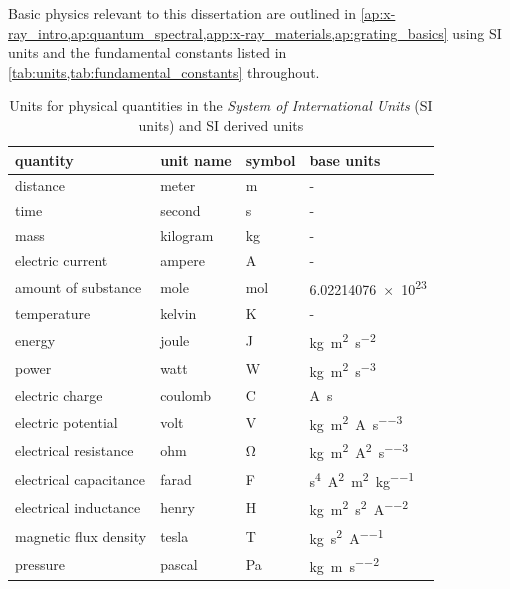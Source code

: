 \label{ap:x-ray_intro}
Basic physics relevant to this dissertation are outlined in \cref{ap:x-ray_intro,ap:quantum_spectral,app:x-ray_materials,ap:grating_basics} using SI units and the fundamental constants listed in \cref{tab:units,tab:fundamental_constants} throughout. 
\begin{table}[]
 \centering
 \caption[SI units for physical quantities]{Units for physical quantities in the \emph{System of International Units} (SI units) and SI derived units} \label{tab:units}
 \begin{tabular}{@{}llll@{}} 
 \toprule
 quantity & unit name & symbol & base units \\ \midrule 
 distance & meter & \si{\metre} & - \\
 time & second & \si{\second} & - \\
 mass & kilogram & \si{\kilogram} & - \\
 electric current & ampere & \si{\ampere} & - \\
 amount of substance & mole & \si{\mole}  & \num{6.02214076e23} \\ 
 temperature & kelvin & \si{\kelvin} & - \\ \midrule 
 energy & joule & \si{\joule} & \si{\kilogram\square\metre\per\square\second} \\
 power & watt & \si{\watt} & \si{\kilogram\square\metre\per\second\tothe{3}} \\ 
 electric charge & coulomb & \si{\coulomb} & \si{\ampere\second} \\
 electric potential & volt & \si{\volt} & \si{\kilogram\square\metre\per\ampere\per\second\tothe{3}} \\
 electrical resistance & ohm & \si{\ohm} & \si{\kilogram\square\metre\per\ampere\tothe{2}\per\second\tothe{3}} \\
 electrical capacitance & farad & \si{\farad} & \si{\second\tothe{4}\ampere\tothe{2}\per\square\metre\per\kilogram} \\
 electrical inductance & henry & \si{\henry} & \si{\kilogram\square\metre\per\square\second\per\square\ampere} \\
 magnetic flux density & tesla & \si{\tesla} & \si{\kilogram\per\square\second\per\ampere} \\
 pressure & pascal & \si{\pascal} & \si{\kilogram\per\metre\per\square\second} \\ %
 \bottomrule
 \end{tabular}
 \end{table}
